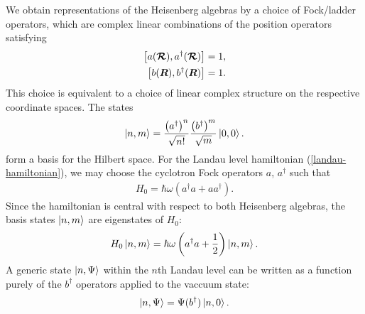 \documentclass[aps,prb,twocolumn,letterpaper,twoside,nobalancelastpage,groupedaddress,amsmath,amssymb,floatfix,citeautoscript]{revtex4-1}
\begin{document}
We obtain representations of the Heisenberg algebras by a choice of Fock/ladder operators, which are complex linear combinations of the position operators satisfying
\begin{align*}
\comm{a(\boldsymbol{\mathcal{R}})}{a^{\dag}(\boldsymbol{\mathcal{R}})} &= 1, \\
\comm{b(\boldsymbol{R})}{b^{\dag}(\boldsymbol{R})} &= 1.
\end{align*}
This choice is equivalent to a choice of linear complex structure on the respective coordinate spaces. The states 
\begin{align}
\label{basis-state}
\ket{n,m} = \frac{\left(a^{\dag}\right)^n}{\sqrt{n!}}\frac{\left(b^{\dag}\right)^m}{\sqrt{m}} \ket{0,0}.
\end{align}
form a basis for the Hilbert space. For the Landau level hamiltonian (\ref{landau-hamiltonian}), we may choose the cyclotron Fock operators $a$, $a^{\dag}$ such that
\begin{align*}
H_0 = \hbar \omega \left(a^{\dag}a + a a^{\dag}\right).
\end{align*}
Since the hamiltonian is central with respect to both Heisenberg algebras, the basis states $\ket{n,m}$ are eigenstates of $H_0$:
\begin{align*}
H_0 \ket{n,m} = \hbar \omega \left(a^{\dag}a + \frac{1}{2}\right)\ket{n,m}.
\end{align*}
A generic state $\ket{n,\Psi}$ within the $n$th Landau level can be written as a function purely of the $b^{\dag}$ operators applied to the vaccuum state:
\begin{align*}
\ket{n,\Psi} = \Psi(b^{\dag})\ket{n,0}.
\end{align*}
\end{document}
